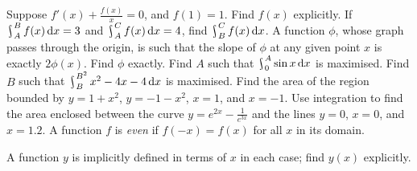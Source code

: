 \begin{questions}
  \questioM Suppose $ f'(x) + \frac{f(x)}{x} = 0 $, and $ f(1) = 1 $. Find $ f(x) $ explicitly.
  \questioM If $ \rint^B_A f(x) \dif{x} = 3 $ and $ \rint^C_A f(x) \dif{x} = 4 $, find $ \rint^C_B f(x) \dif{x} $.
  \questioM A function $ \phi $, whose graph passes through the origin, is such that the slope of $ \phi $ at any given
            point $ x $ is exactly $ 2\phi(x) $. Find $ \phi $ exactly.
  \questioE Find $ A $ such that $ \rint^A_0 \sin x \dif{x} $ is maximised.
  \questioE Find $ B $ such that $ \rint_B^{B^2} x^2 - 4x - 4 \dif{x} $ is maximised.
  \questioM Find the area of the region bounded by $ y = 1 + x^2 $, $ y = - 1 - x^2 $, $ x = 1 $, and $ x = -1 $.
  \questioM Use integration to find the area enclosed between the curve $ y = e^{2x} - \frac{1}{e^{3x}} $ and the
            lines $ y = 0 $, $ x = 0 $, and $ x = 1.2 $.
  \questioM A function $ f $ is \textit{even} if $ f(-x) = f(x) $ for all $ x $ in its domain.
  \questioM A function $ y $ is implicitly defined in terms of $ x $ in each case; find $ y(x) $ explicitly.
    \begin{parts}

\end{parts}
\end{questions}
